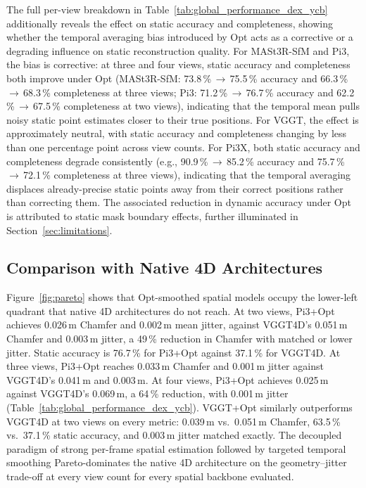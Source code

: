 The full per-view breakdown in Table~\ref{tab:global_performance_dex_ycb} additionally
reveals the effect on static accuracy and completeness, showing whether the temporal
averaging bias introduced by Opt acts as a corrective or a degrading influence on
static reconstruction quality. For MASt3R-SfM and Pi3, the bias is corrective: at
three and four views, static accuracy and completeness both improve under Opt
(MASt3R-SfM: 73.8\,\%\,$\to$\,75.5\,\% accuracy and 66.3\,\%\,$\to$\,68.3\,\%
completeness at three views; Pi3: 71.2\,\%\,$\to$\,76.7\,\% accuracy and
62.2\,\%\,$\to$\,67.5\,\% completeness at two views), indicating that the temporal
mean pulls noisy static point estimates closer to their true positions. For VGGT, the
effect is approximately neutral, with static accuracy and completeness changing by less
than one percentage point across view counts. For Pi3X, both static accuracy and
completeness degrade consistently (e.g., 90.9\,\%\,$\to$\,85.2\,\% accuracy and
75.7\,\%\,$\to$\,72.1\,\% completeness at three views), indicating that the temporal
averaging displaces already-precise static points away from their correct positions
rather than correcting them. The associated reduction in dynamic accuracy under Opt
is attributed to static mask boundary effects, further illuminated in Section~\ref{sec:limitations}.

\subsection{Comparison with Native 4D Architectures}
Figure~\ref{fig:pareto} shows that Opt-smoothed spatial models occupy the lower-left
quadrant that native 4D architectures do not reach. At two views, Pi3+Opt achieves
0.026\,m Chamfer and 0.002\,m mean jitter, against VGGT4D's 0.051\,m Chamfer and
0.003\,m jitter, a 49\,\% reduction in Chamfer with matched or lower jitter. Static
accuracy is 76.7\,\% for Pi3+Opt against 37.1\,\% for VGGT4D. At three views,
Pi3+Opt reaches 0.033\,m Chamfer and 0.001\,m jitter against VGGT4D's 0.041\,m and
0.003\,m. At four views, Pi3+Opt achieves 0.025\,m against VGGT4D's 0.069\,m, a
64\,\% reduction, with 0.001\,m jitter
(Table~\ref{tab:global_performance_dex_ycb}). VGGT+Opt similarly outperforms VGGT4D
at two views on every metric: 0.039\,m vs.\ 0.051\,m Chamfer, 63.5\,\% vs.\ 37.1\,\%
static accuracy, and 0.003\,m jitter matched exactly. The decoupled paradigm of strong
per-frame spatial estimation followed by targeted temporal smoothing Pareto-dominates
the native 4D architecture on the geometry--jitter trade-off at every view count for
every spatial backbone evaluated.

